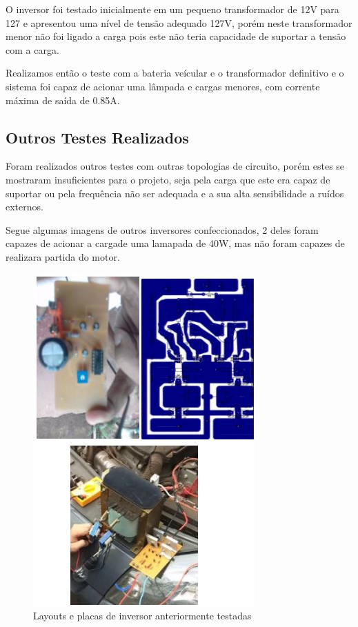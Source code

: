 O inversor foi testado inicialmente em um pequeno transformador de 12V para 127 e apresentou uma nível de tensão adequado 127V, porém neste transformador menor não foi ligado a carga pois este não teria capacidade de suportar a tensão com a carga.

Realizamos então o teste com a bateria veícular e o transformador definitivo e o sistema foi capaz de acionar uma lâmpada e cargas menores, com corrente máxima de saída de 0.85A.

\subsection{Outros Testes Realizados}
Foram realizados outros testes com outras topologias de circuito,  porém estes se mostraram insuficientes para o projeto, seja pela carga que este era capaz de suportar ou pela frequência não ser adequada e a sua alta sensibilidade a ruídos externos.

Segue algumas imagens de outros inversores confeccionados, 2 deles foram capazes de acionar a cargade uma lamapada de 40W, mas não foram capazes de realizara partida do motor.

			\begin{figure}[H]
				\begin{center}
				\includegraphics[scale = 0.75]{figuras/Inversor}
				\caption{Layouts e placas de inversor  anteriormente testadas}
				 	\end{center}
			\end{figure}
			
